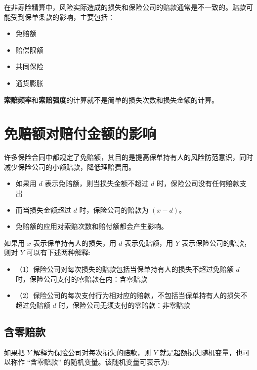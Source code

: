 \documentclass[
]{book}
\begin{document}
在非寿险精算中，风险实际造成的损失和保险公司的赔款通常是不一致的。赔款可能受到保单条款的影响，主要包括：

\begin{itemize}
\item
  免赔额
\item
  赔偿限额
\item
  共同保险
\item
  通货膨胀
\end{itemize}

\textbf{索赔频率}和\textbf{索赔强度}的计算就不是简单的损失次数和损失金额的计算。

\hypertarget{ux514dux8d54ux989dux5bf9ux8d54ux4ed8ux91d1ux989dux7684ux5f71ux54cd}{%
\section{免赔额对赔付金额的影响}\label{ux514dux8d54ux989dux5bf9ux8d54ux4ed8ux91d1ux989dux7684ux5f71ux54cd}}

许多保险合同中都规定了免赔额，其目的是提高保单持有人的风险防范意识，同时减少保险公司的小额赔款，降低理赔费用。

\begin{itemize}
\item
  如果用 \(d\) 表示免赔额，则当损失金额不超过 \(d\) 时，保险公司没有任何赔款支出
\item
  而当损失金额超过 \(d\) 时，保险公司的赔款为 \((x-d)\)。
\item
  免赔额的应用对索赔次数和赔付额都会产生影响。
\end{itemize}

如果用 \(x\) 表示保单持有人的损失，用 \(d\) 表示免赔额，用 \(Y\) 表示保险公司的赔款，则对 \(Y\) 可以有下述两种解释:

\begin{itemize}
\item
  （1）保险公司对每次损失的赔款包括当保单持有人的损失不超过免赔额 \(d\) 时，保险公司支付的零赔款在内：含零赔款
\item
  （2）保险公司的每次支付行为相对应的赔款，不包括当保单持有人的损失不超过免赔额 \(d\) 时，保险公司无须支付的零赔款：非零赔款
\end{itemize}

\hypertarget{ux542bux96f6ux8d54ux6b3e}{%
\subsection{含零赔款}\label{ux542bux96f6ux8d54ux6b3e}}

如果把 \(Y\) 解释为保险公司对每次损失的赔款，则 \(Y\) 就是超额损失随机变量，也可以称作 ``含零赔款'' 的随机变量。该随机变量可表示为:
\end{document}
